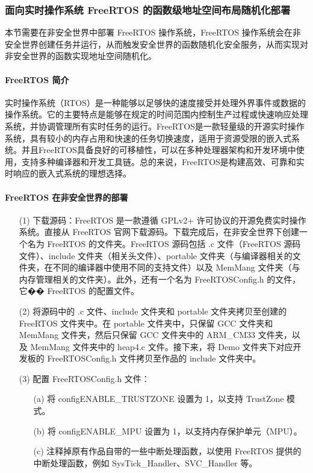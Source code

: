 \documentclass[12pt,a4paper]{ctexart}
\numberwithin{figure}{section}
\begin{document}
\subsubsection{面向实时操作系统 FreeRTOS 的函数级地址空间布局随机化部署}
\par 本节需要在非安全世界中部署 FreeRTOS 操作系统，FreeRTOS 操作系统会在非安全世界创建任务并运行，从而触发安全世界的函数随机化安全服务，从而实现对非安全世界的函数实现地址空间随机化。
\paragraph{FreeRTOS 简介}
\par 实时操作系统（RTOS）是一种能够以足够快的速度接受并处理外界事件或数据的操作系统。它的主要特点是能够在规定的时间范围内控制生产过程或快速响应处理系统，并协调管理所有实时任务的运行。FreeRTOS是一款轻量级的开源实时操作系统，具有较小的内存占用和快速的任务切换速度，适用于资源受限的嵌入式系统。并且FreeRTOS具备良好的可移植性，可以在多种处理器架构和开发环境中使用，支持多种编译器和开发工具链。总的来说，FreeRTOS是构建高效、可靠和实时响应的嵌入式系统的理想选择。
\paragraph{FreeRTOS 在非安全世界的部署}
\begin{itemize}
    \item[(1)] 下载源码：FreeRTOS 是一款遵循 GPLv2+ 许可协议的开源免费实时操作系统。直接从 FreeRTOS 官网下载源码。下载完成后，在非安全世界下创建一个名为 FreeRTOS 的文件夹。FreeRTOS 源码包括 .c 文件（FreeRTOS 源码文件）、include 文件夹（相关头文件）、portable 文件夹（与编译器相关的文件夹，在不同的编译器中使用不同的支持文件）以及 MemMang 文件夹（与内存管理相关的文件夹）。此外，还有一个名为 FreeRTOSConfig.h 的文件，它�� FreeRTOS 的配置文件。
        
    \item[(2)] 将源码中的 .c 文件、include 文件夹和 portable 文件夹拷贝至创建的 FreeRTOS 文件夹中。在 portable 文件夹中，只保留 GCC 文件夹和 MemMang 文件夹，然后只保留 GCC 文件夹中的 ARM\_CM33 文件夹，以及 MemMang 文件夹中的 heap4.c 文件。接下来，将 Demo 文件夹下对应开发板的 FreeRTOSConfig.h 文件拷贝至作品的 include 文件夹中。
        
    \item[(3)] 配置 FreeRTOSConfig.h 文件：
        \begin{itemize}
            \item[(a)] 将 configENABLE\_TRUSTZONE 设置为 1，以支持 TrustZone 模式。
            \item[(b)] 将 configENABLE\_MPU 设置为 1，以支持内存保护单元（MPU）。
            \item[(c)] 注释掉原有作品自带的一些中断处理函数，以使用 FreeRTOS 提供的中断处理函数，例如 SysTick\_Handler、SVC\_Handler 等。
        \end{itemize}
\end{itemize}
\end{document}
